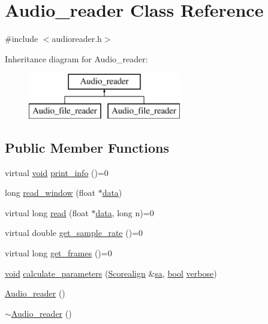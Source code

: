 \hypertarget{class_audio__reader}{}\section{Audio\+\_\+reader Class Reference}
\label{class_audio__reader}


{\ttfamily \#include $<$audioreader.\+h$>$}

Inheritance diagram for Audio\+\_\+reader\+:\begin{figure}[H]
\begin{center}
\leavevmode
\includegraphics[height=2.000000cm]{class_audio__reader}
\end{center}
\end{figure}
\subsection*{Public Member Functions}
\begin{DoxyCompactItemize}
\item 
virtual \hyperlink{sound_8c_ae35f5844602719cf66324f4de2a658b3}{void} \hyperlink{class_audio__reader_ad05e1d11a1417ea626087457b0b281a7}{print\+\_\+info} ()=0
\item 
long \hyperlink{class_audio__reader_ae91a82ce414add504469c6423618098c}{read\+\_\+window} (float $\ast$\hyperlink{lib_2expat_8h_ac39e72a1de1cb50dbdc54b08d0432a24}{data})
\item 
virtual long \hyperlink{class_audio__reader_a736640d60600e59561e9caccae519a26}{read} (float $\ast$\hyperlink{lib_2expat_8h_ac39e72a1de1cb50dbdc54b08d0432a24}{data}, long n)=0
\item 
virtual double \hyperlink{class_audio__reader_aae32f2ab4cf0dfa48c83ef5ce6dbfc2a}{get\+\_\+sample\+\_\+rate} ()=0
\item 
virtual long \hyperlink{class_audio__reader_a39ea4a10b388a60800dcd5f583cb40eb}{get\+\_\+frames} ()=0
\item 
\hyperlink{sound_8c_ae35f5844602719cf66324f4de2a658b3}{void} \hyperlink{class_audio__reader_ab1f926053058d6bbc6ebf869aeb8d6bc}{calculate\+\_\+parameters} (\hyperlink{class_scorealign}{Scorealign} \&\hyperlink{lib-src_2libscorealign_2main_8cpp_a1aa9083626d69f94349750d974f0359a}{sa}, \hyperlink{mac_2config_2i386_2lib-src_2libsoxr_2soxr-config_8h_abb452686968e48b67397da5f97445f5b}{bool} \hyperlink{mm_8c_ab421ea2a103f8a57c338dc30e3cf4f6b}{verbose})
\item 
\hyperlink{class_audio__reader_a68f8f1cc2c02d825745f658805297e70}{Audio\+\_\+reader} ()
\item 
\hyperlink{class_audio__reader_a22025ec4038f0bd0804abe765c2f5b9d}{$\sim$\+Audio\+\_\+reader} ()
\end{DoxyCompactItemize}
